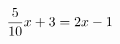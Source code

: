 \documentclass[preview]{standalone}
\begin{document}
\begin{align*}
\special{dvisvgm:raw <g id='unique000'>}\frac{5}{10}x+3=2x-1 \special{dvisvgm:raw </g>}
\end{align*}
\end{document}

